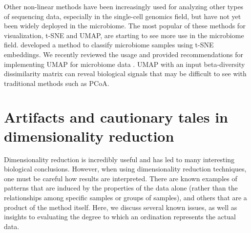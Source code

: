 Other non-linear methods have been increasingly used for analyzing other types of sequencing data, especially in the single-cell genomics field, but have not yet been widely deployed in the microbiome. The most popular of these methods for visualization, t-SNE and UMAP, are starting to see more use in the microbiome field. \cite{Xu2020-ht} developed a method to classify microbiome samples using t-SNE embeddings. We recently reviewed the usage and provided recommendations for implementing UMAP for microbiome data \cite{Armstrong2021-tr}. UMAP with an input beta-diversity dissimilarity matrix can reveal biological signals that may be difficult to see with traditional methods such as PCoA. 

\section{Artifacts and cautionary tales in dimensionality reduction}

Dimensionality reduction is incredibly useful and has led to many interesting biological conclusions. However, when using dimensionality reduction techniques, one must be careful how results are interpreted. There are known examples of patterns that are induced by the properties of the data alone (rather than the relationships among specific samples or groups of samples), and others that are a product of the method itself. Here, we discuss several known issues, as well as insights to evaluating the degree to which an ordination represents the actual data.

